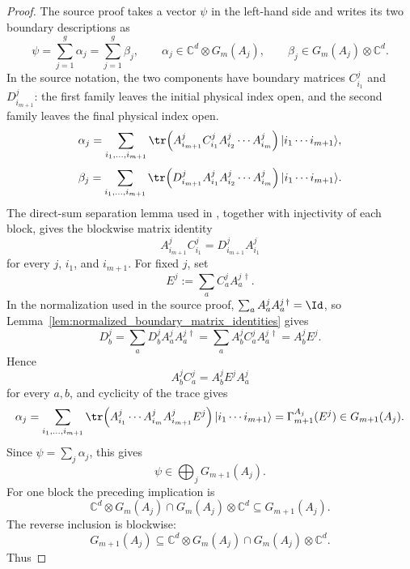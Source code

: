 \begin{proof}
    \notready
    The source proof takes a vector $\psi$ in the left-hand side and writes its
    two boundary descriptions as
    \[
        \psi=\sum_{j=1}^g \alpha_j=\sum_{j=1}^g \beta_j,
        \qquad
        \alpha_j\in\mathbb C^d\otimes G_m(A_j),
        \qquad
        \beta_j\in G_m(A_j)\otimes\mathbb C^d .
    \]
    In the source notation, the two components have boundary matrices
    $C^j_{i_1}$ and $D^j_{i_{m+1}}$: the first family leaves the initial
    physical index open, and the second family leaves the final physical index
    open.
    \[
        \alpha_j
        =
        \sum_{i_1,\ldots,i_{m+1}}
        \tr\!\left(
        A^j_{i_{m+1}} C^j_{i_1}
        A^j_{i_2}\cdots A^j_{i_m}
        \right)
        |i_1\cdots i_{m+1}\rangle,
    \]
    \[
        \beta_j
        =
        \sum_{i_1,\ldots,i_{m+1}}
        \tr\!\left(
        D^j_{i_{m+1}}
        A^j_{i_1} A^j_{i_2}\cdots A^j_{i_m}
        \right)
        |i_1\cdots i_{m+1}\rangle.
    \]
    The direct-sum separation lemma used in
    \cite[Theorem~2blocks.2]{PerezGarcia2007Matrix}, together with injectivity
    of each block, gives the blockwise matrix identity
    \[
        A^j_{i_{m+1}} C^j_{i_1}
        =
        D^j_{i_{m+1}} A^j_{i_1}
    \]
    for every $j$, $i_1$, and $i_{m+1}$. For fixed $j$, set
    \[
        E^j:=\sum_a C^j_a A^{j\,\dagger}_a .
    \]
    In the normalization used in the source proof,
    $\sum_a A^j_a A^{j\,\dagger}_a=\Id$, so
    Lemma~\ref{lem:normalized_boundary_matrix_identities} gives
    \[
        D^j_b
        =
        \sum_a D^j_b A^j_a A^{j\,\dagger}_a
        =
        \sum_a A^j_b C^j_a A^{j\,\dagger}_a
        =
        A^j_b E^j .
    \]
    Hence
    \[
        A^j_b C^j_a
        =
        A^j_b E^j A^j_a
    \]
    for every $a,b$, and cyclicity of the trace gives
    \[
        \alpha_j
        =
        \sum_{i_1,\ldots,i_{m+1}}
        \tr\!\left(A^j_{i_1}\cdots A^j_{i_m}
        A^j_{i_{m+1}}E^j\right)
        |i_1\cdots i_{m+1}\rangle
        =
        \Gamma_{m+1}^{A_j}(E^j)
        \in G_{m+1}(A_j).
    \]
    Since $\psi=\sum_j\alpha_j$, this gives
    \[
        \psi\in\bigoplus_j G_{m+1}(A_j).
    \]
    For one block the preceding implication is
    \[
        \mathbb C^d\otimes G_m(A_j)
        \cap
        G_m(A_j)\otimes\mathbb C^d
        \subseteq
        G_{m+1}(A_j).
    \]
    The reverse inclusion is blockwise:
    \[
        G_{m+1}(A_j)
        \subseteq
        \mathbb C^d\otimes G_m(A_j)
        \cap
        G_m(A_j)\otimes\mathbb C^d .
    \]
    Thus

\end{proof}
